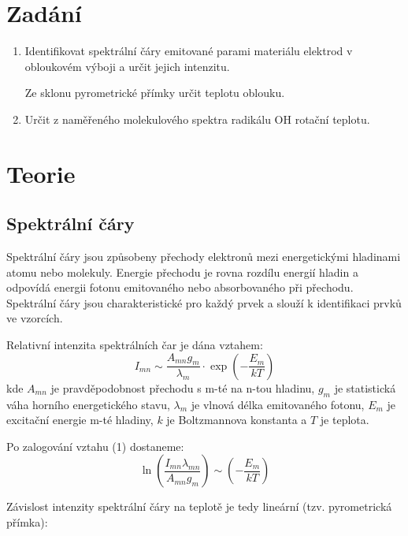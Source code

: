 \documentclass[a4paper,11pt]{article}
\begin{document}
\vskip10pt
    \begin{minipage}[t]{0.5\textwidth} 
        \section{Zadání}    
            \begin{enumerate}
                \item Identifikovat spektrální čáry emitované parami materiálu elektrod v obloukovém výboji a určit jejich intenzitu. 
                \par Ze sklonu pyrometrické přímky určit teplotu oblouku.
                \item Určit z naměřeného molekulového spektra radikálu OH rotační teplotu.
            \end{enumerate}
        \section{Teorie}
            \subsection{Spektrální čáry}
                \par Spektrální čáry jsou způsobeny přechody elektronů mezi energetickými hladinami atomu nebo molekuly. Energie přechodu je rovna rozdílu energií hladin a odpovídá energii fotonu emitovaného nebo absorbovaného při přechodu. Spektrální čáry jsou charakteristické pro každý prvek a slouží k identifikaci prvků ve vzorcích.
                \par Relativní intenzita spektrálních čar je dána vztahem:
                \begin{equation}
                    I_{mn} \sim \frac{A_{mn}g_m}{\lambda_m} \cdot \exp\left(-\frac{E_{m}}{kT}\right)
                \end{equation}
                kde $A_{mn}$ je pravděpodobnost přechodu s m-té na n-tou hladinu, $g_m$ je statistická váha horního energetického stavu, $\lambda_m$ je vlnová délka emitovaného fotonu, $E_m$ je excitační energie m-té hladiny, $k$ je Boltzmannova konstanta a $T$ je teplota.
                \par Po zalogování vztahu (1) dostaneme:
                \begin{equation}
                    \ln\left(\frac{I_{mn}\lambda_{mn}}{A_{mn}g_m}\right) \sim \left(-\frac{E_{m}}{kT}\right)
                \end{equation}
                \par Závislost intenzity spektrální čáry na teplotě je tedy lineární (tzv. pyrometrická přímka):
    \end{minipage}
\end{document}
